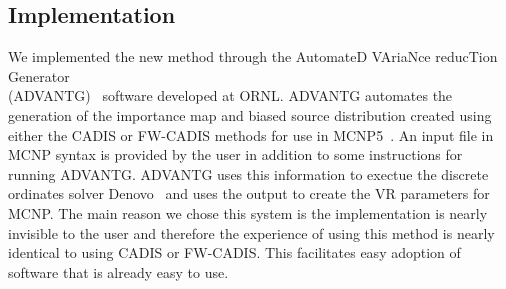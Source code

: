 \documentclass[12pt]{article}
\begin{document}
%
% 

%

\subsection{Implementation}
\label{subsect::implementation}

We implemented the new method through the AutomateD VAriaNce reducTion Generator\\ (ADVANTG)~\cite{wagner_automated_2002, mosher_new_2010} software developed at ORNL. 
ADVANTG automates the generation of the importance map and biased source distribution created using either the CADIS or FW-CADIS methods for use in MCNP5~\cite{brown_mcnp_2002}. 
An input file in MCNP syntax is provided by the user in addition to some instructions for running ADVANTG. 
ADVANTG uses this information to exectue the discrete ordinates solver Denovo~\cite{evans_denovo:_2010} and uses the output to create the VR parameters for MCNP.
The main reason we chose this system is the implementation is nearly invisible to the user and therefore the experience of using this method is nearly identical to using CADIS or FW-CADIS.
This facilitates easy adoption of software that is already easy to use.
\end{document}
